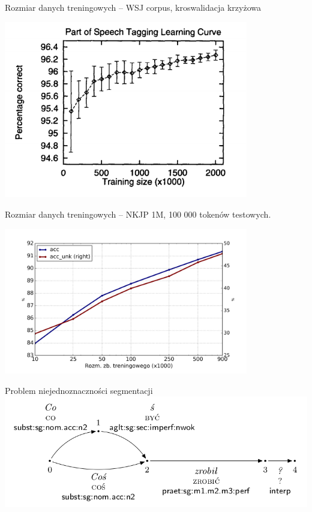 \documentclass[xcolor=dvipsnames,polish]{beamer}
\begin{document}
\begin{frame}{Rozmiar danych treningowych}
   -- WSJ corpus, kroswalidacja krzyżowa
  \begin{center}
    \includegraphics[width=0.8\textwidth]{img/mbt_lcurve.png}
  \end{center}
\end{frame}

\begin{frame}{Rozmiar danych treningowych}
   -- NKJP 1M, 100 000 tokenów testowych.
  \begin{center}
    \includegraphics[width=0.8\textwidth]{img/concraft_lcurve.png}
  \end{center}
\end{frame}

\begin{frame}{Problem niejednoznaczności segmentacji}
  \\
  \includegraphics[width=\textwidth]{img/segm_amb1.png}
\end{frame}
\end{document}
